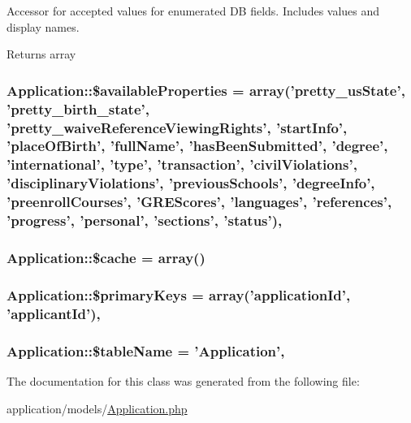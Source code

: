 Accessor for accepted values for enumerated D\-B fields. Includes values and display names.

\begin{DoxyReturn}{Returns}
array 
\end{DoxyReturn}
\hypertarget{class_application_ad163d595ac386299a823144df8f994c9}{
\subsubsection[{\$available\-Properties}]{\setlength{\rightskip}{0pt plus 5cm}Application\-::\$available\-Properties = array('pretty\-\_\-us\-State', 'pretty\-\_\-birth\-\_\-state', 'pretty\-\_\-waive\-Reference\-Viewing\-Rights', 'start\-Info', 'place\-Of\-Birth', 'full\-Name', 'has\-Been\-Submitted', 'degree', 'international', 'type', 'transaction', 'civil\-Violations', 'disciplinary\-Violations', 'previous\-Schools', 'degree\-Info', 'preenroll\-Courses', 'G\-R\-E\-Scores', 'languages', 'references', 'progress', 'personal', 'sections', 'status')\hspace{0.3cm}{\ttfamily [static]}, {\ttfamily [protected]}}}\label{class_application_ad163d595ac386299a823144df8f994c9}
\hypertarget{class_application_ad4d95078c736fe6a11194e448b344ed9}{
\subsubsection[{\$cache}]{\setlength{\rightskip}{0pt plus 5cm}Application\-::\$cache = array()\hspace{0.3cm}{\ttfamily [protected]}}}\label{class_application_ad4d95078c736fe6a11194e448b344ed9}
\hypertarget{class_application_a422eb23dc2547e670cce2ed73efbbb4a}{
\subsubsection[{\$primary\-Keys}]{\setlength{\rightskip}{0pt plus 5cm}Application\-::\$primary\-Keys = array('application\-Id', 'applicant\-Id')\hspace{0.3cm}{\ttfamily [static]}, {\ttfamily [protected]}}}\label{class_application_a422eb23dc2547e670cce2ed73efbbb4a}
\hypertarget{class_application_ac5d5d4430ce219571bc04bc13b1a8937}{
\subsubsection[{\$table\-Name}]{\setlength{\rightskip}{0pt plus 5cm}Application\-::\$table\-Name = '{\bf Application}'\hspace{0.3cm}{\ttfamily [static]}, {\ttfamily [protected]}}}\label{class_application_ac5d5d4430ce219571bc04bc13b1a8937}


The documentation for this class was generated from the following file\-:\begin{DoxyCompactItemize}
\item 
application/models/\hyperlink{_application_8php}{Application.\-php}\end{DoxyCompactItemize}
